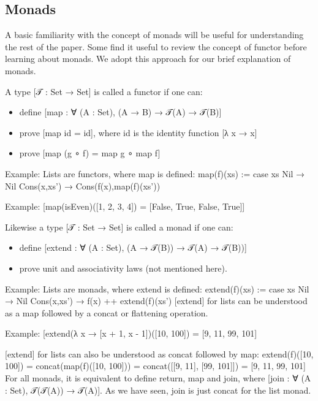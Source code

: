 \documentclass{article}
\begin{document}

\subsection{Monads}
\label{section:Background:Monads}

A basic familiarity with the concept of monads will be useful for understanding the rest of the paper.
%
Some find it useful to review the concept of functor before learning about monads. 
%
We adopt this approach for our brief explanation of monads.


A type [𝒯 : Set → Set] is called a functor if one can:
%
\begin{itemize}
\item define [map : ∀ (A : Set), (A → B) → 𝒯(A) → 𝒯(B)]
\item prove [map id = id], where id is the identity function [λ x → x]
\item prove [map (g ∘ f) = map g ∘ map f]
\end{itemize}


Example: Lists are functors, where map is defined:
%
    map(f)(xs) := case xs 
      Nil → Nil 
      Cons(x,xs') → Cons(f(x),map(f)(xs'))


Example: [map(isEven)([1, 2, 3, 4]) = [False, True, False, True]]


Likewise a type [𝒯 : Set → Set] is called a monad if one can:
%
\begin{itemize}
\item define [extend : ∀ (A : Set), (A → 𝒯(B)) → 𝒯(A) → 𝒯(B))]
\item prove unit and associativity laws (not mentioned here).
\end{itemize}


Example: Lists are monads, where extend is defined:
%
    extend(f)(xs) := case xs
      Nil → Nil
      Cons(x,xs') → f(x) ++ extend(f)(xs')
%
[extend] for lists can be understood as a map followed by a concat or flattening operation.


Example: [extend(λ x → [x + 1, x - 1])([10, 100]) = [9, 11, 99, 101]


[extend] for lists can also be understood as concat followed by map:
%
      extend(f)([10, 100]) 
    = concat(map(f)([10, 100])) 
    = concat([[9, 11], [99, 101]]) = [9, 11, 99, 101]
%
For all monads, it is equivalent to define return, map and join, where [join :
∀ (A : Set), 𝒯(𝒯(A)) → 𝒯(A)].
%
As we have seen, join is just concat for the list monad.
\end{document}
